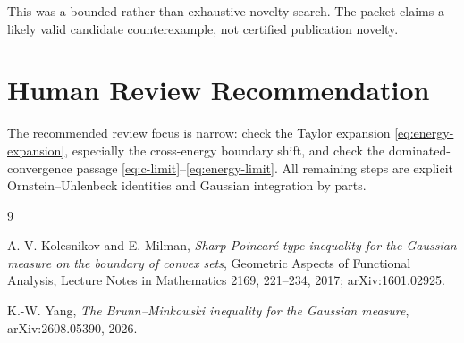 \documentclass[11pt]{article}
\begin{document}
This was a bounded rather than exhaustive novelty search.  The packet claims
a likely valid candidate counterexample, not certified publication novelty.

\section*{Human Review Recommendation}

The recommended review focus is narrow: check the Taylor expansion
\eqref{eq:energy-expansion}, especially the cross-energy boundary shift, and
check the dominated-convergence passage \eqref{eq:c-limit}--\eqref{eq:energy-limit}.
All remaining steps are explicit Ornstein--Uhlenbeck identities and Gaussian
integration by parts.

\begin{thebibliography}{9}

A. V. Kolesnikov and E. Milman,
\emph{Sharp Poincar\'e-type inequality for the Gaussian measure on the boundary
of convex sets}, Geometric Aspects of Functional Analysis, Lecture Notes in
Mathematics 2169, 221--234, 2017; arXiv:1601.02925.

K.-W. Yang,
\emph{The Brunn--Minkowski inequality for the Gaussian measure},
arXiv:2608.05390, 2026.

\end{thebibliography}
\end{document}
